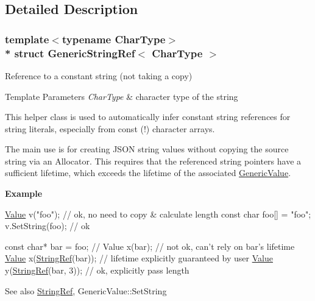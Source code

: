 \subsection{Detailed Description}
\subsubsection*{template$<$typename Char\+Type$>$\\*
struct Generic\+String\+Ref$<$ Char\+Type $>$}

Reference to a constant string (not taking a copy) 


\begin{DoxyTemplParams}{Template Parameters}
{\em Char\+Type} & character type of the string\\
\hline
\end{DoxyTemplParams}
This helper class is used to automatically infer constant string references for string literals, especially from {\ttfamily const} {\bfseries }(!) character arrays.

The main use is for creating J\+S\+ON string values without copying the source string via an Allocator. This requires that the referenced string pointers have a sufficient lifetime, which exceeds the lifetime of the associated \hyperlink{class_generic_value}{Generic\+Value}.

{\bfseries Example} 
\begin{DoxyCode}
\hyperlink{class_generic_value}{Value} v(\textcolor{stringliteral}{"foo"});   \textcolor{comment}{// ok, no need to copy & calculate length}
\textcolor{keyword}{const} \textcolor{keywordtype}{char} foo[] = \textcolor{stringliteral}{"foo"};
v.SetString(foo); \textcolor{comment}{// ok}

\textcolor{keyword}{const} \textcolor{keywordtype}{char}* bar = foo;
\textcolor{comment}{// Value x(bar); // not ok, can't rely on bar's lifetime}
\hyperlink{class_generic_value}{Value} x(\hyperlink{struct_generic_string_ref_aa6b9fd9f6aa49405a574c362ba9af6b5}{StringRef}(bar)); \textcolor{comment}{// lifetime explicitly guaranteed by user}
\hyperlink{class_generic_value}{Value} y(\hyperlink{struct_generic_string_ref_aa6b9fd9f6aa49405a574c362ba9af6b5}{StringRef}(bar, 3));  \textcolor{comment}{// ok, explicitly pass length}
\end{DoxyCode}


\begin{DoxySeeAlso}{See also}
\hyperlink{struct_generic_string_ref_aa6b9fd9f6aa49405a574c362ba9af6b5}{String\+Ref}, Generic\+Value\+::\+Set\+String 
\end{DoxySeeAlso}


